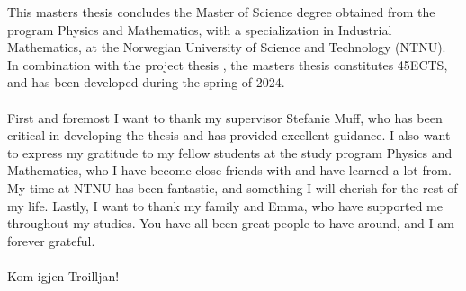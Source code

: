 This masters thesis concludes the Master of Science degree obtained from the program Physics and Mathematics, with a specialization in Industrial Mathematics, at the Norwegian University of Science and Technology (NTNU). In combination with the project thesis \citep{Arnstad}, the masters thesis constitutes 45ECTS, and has been developed during the spring of 2024.
\\
\\
First and foremost I want to thank my supervisor Stefanie Muff, who has been critical in developing the thesis and has provided excellent guidance. I also want to express my gratitude to my fellow students at the study program Physics and Mathematics, who I have become close friends with and have learned a lot from. My time at NTNU has been fantastic, and something I will cherish for the rest of my life. Lastly, I want to thank my family and Emma, who have supported me throughout my studies. You have all been great people to have around, and I am forever grateful. 
\\
\\
Kom igjen Troilljan!